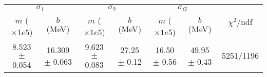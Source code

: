 \begin{tabular}{cc|cc|cc||c}
\multicolumn{2}{c|}{$\sigma_1$} & \multicolumn{2}{|c}{$\sigma_2$} & \multicolumn{2}{|c}{$\sigma_G$}  & \multirow{2}{*}{$\chi^2/$ndf}\\
$m$ ($\times1e5$) & $b$ (MeV) & $m$ ($\times1e5$) & $b$ (MeV) & $m$ ($\times1e5$) & $b$ (MeV) & \\
\hline
8.523 $\pm$ 0.054 & 16.309 $\pm$ 0.063 & 9.623 $\pm$ 0.083 & 27.25 $\pm$ 0.12 & 16.50 $\pm$ 0.56 & 49.95 $\pm$ 0.43 & 5251/1196\\
\end{tabular}
